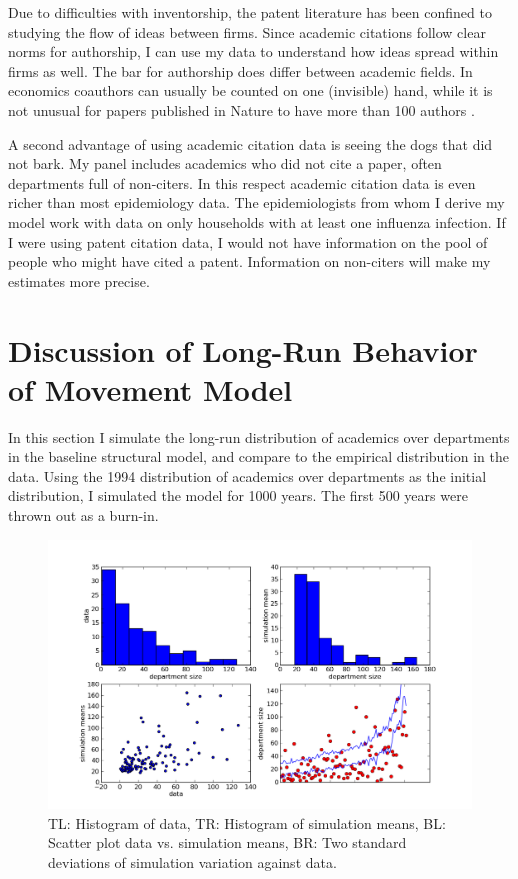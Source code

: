 Due to difficulties with inventorship, the patent literature has been
confined to studying the flow of ideas between firms. Since academic
citations follow clear norms for authorship, I can use my data to
understand how ideas spread within firms as well. The bar for authorship
does differ between academic fields. In economics coauthors can usually
be counted on one (invisible) hand, while it is not unusual for papers
published in Nature to have more than 100 authors
\citep{greene2007demise}.

A second advantage of using academic citation data is seeing the dogs
that did not bark. My panel includes academics who did not cite a paper,
often departments full of non-citers. In this respect academic citation
data is even richer than most epidemiology data. The epidemiologists
from whom I derive my model work with data on only households with at
least one influenza infection. If I were using patent citation data, I
would not have information on the pool of people who might have cited a
patent. Information on non-citers will make my estimates more precise.

\section{Discussion of Long-Run Behavior of Movement Model}
\label{sec:movdists}

In this section I simulate the long-run distribution of academics over departments
in the baseline structural model, and compare to the empirical
distribution in the data.  Using the 1994 distribution of academics over departments
as the initial distribution, I simulated the model for 1000 years.  The first 500
years were thrown out as a burn-in.

\begin{figure}[h!]
    \centering
    \includegraphics{pics/mov_plts.png}
    \caption{TL: Histogram of data, TR: Histogram of simulation means, BL: Scatter plot data vs. simulation means, BR: Two standard deviations of simulation variation against data.}
    \label{fig:mov_plts}
\end{figure}

